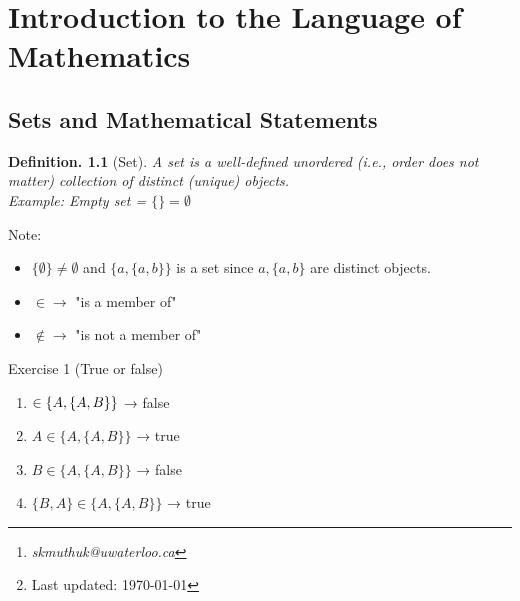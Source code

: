 \documentclass[11pt, a4paper]{memoir}
\title{\subject}
\author{Sachin Kumar\thanks{\itshape skmuthuk@uwaterloo.ca}\\ University of Waterloo}
\date{\semester\thanks{Last updated: \today}}
\theoremstyle{change}
\theoremstyle{plain}
\theoremstyle{nonumberplain}
\newtheorem{definition}{Definition.}
\numberwithin{equation}{section}
\begin{document}
\hypersetup{pageanchor=false}
\maketitle
\newpage
\frontmatter
\hypersetup{pageanchor=true}
\tableofcontents*
\newpage
\mainmatter







\chapter{Introduction to the Language of Mathematics}
\section{Sets and Mathematical Statements}
\begin{definition}[Set]
A set is a well-defined unordered (i.e., order does not matter) collection of distinct (unique) objects.\\
Example: 
Empty set = $\{\} = \emptyset$
\end{definition}
Note:
\begin{itemize}
    \item $\{\emptyset\} \ne \emptyset$ and $\{a, \{a, b\}\}$ is a set since $a, \{a, b\}$ are distinct objects.
    \item $\in \to $ "is a member of"
    \item $\notin \to $ "is not a member of"
\end{itemize}
Exercise 1 (True or false)
\begin{enumerate}
    \item $\empty \in \{A, \{A, B\}\}$ → false
    \item $A \in \{A, \{A, B\}\}$ → true
    \item $B \in \{A, \{A, B\}\}$ → false
    \item $\{B, A\} \in \{A , \{A, B\}\}$ → true
\end{enumerate}
\end{document}
